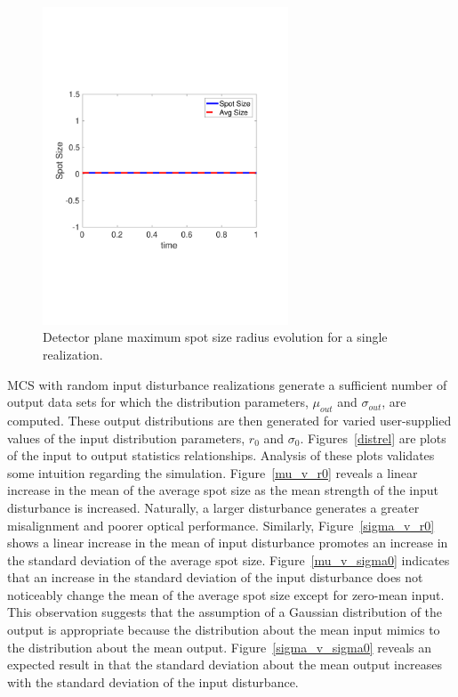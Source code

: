\begin{figure}
	\centering
	\includegraphics[width=0.65\textwidth,trim=1cm 6cm 2cm 6cm,clip]{Figures/Q5P1_real_SpotSizeEvolution.pdf}
	\caption{Detector plane maximum spot size radius evolution for a single realization.}
	\label{ssEvolution}
\end{figure}


MCS with random input disturbance realizations generate a sufficient number of output data sets for which the distribution parameters, $\mu_{out}$ and $\sigma_{out}$, are computed. These output distributions are then generated for varied user-supplied values of the input distribution parameters, $r_0$ and $\sigma_0$. Figures~\ref{distrel} are plots of the input to output statistics relationships. Analysis of these plots validates some intuition regarding the simulation. Figure~\ref{mu_v_r0} reveals a linear increase in the mean of the average spot size as the mean strength of the input disturbance is increased. Naturally, a larger disturbance generates a greater misalignment and poorer optical performance. Similarly, Figure~\ref{sigma_v_r0} shows a linear increase in the mean of input disturbance promotes an increase in the standard deviation of the average spot size. Figure~\ref{mu_v_sigma0} indicates that an increase in the standard deviation of the input disturbance does not noticeably change the mean of the average spot size except for zero-mean input. This observation suggests that the assumption of a Gaussian distribution of the output is appropriate because the distribution about the mean input mimics to the distribution about the mean output. Figure~\ref{sigma_v_sigma0} reveals an expected result in that the standard deviation about the mean output increases with the standard deviation of the input disturbance. \\

